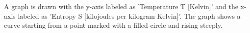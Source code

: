 A graph is drawn with the y-axis labeled as 'Temperature T [Kelvin]' and the x-axis labeled as 'Entropy S [kilojoules per kilogram Kelvin]'. The graph shows a curve starting from a point marked with a filled circle and rising steeply.